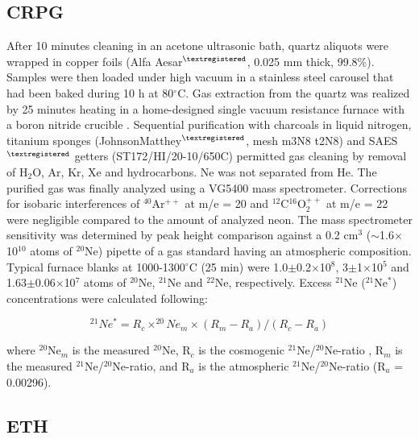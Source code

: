 \documentclass[authoryear,review,12pt]{elsarticle}
\begin{document}
\subsection{CRPG}

After 10 minutes cleaning in an acetone ultrasonic bath, quartz
aliquots were wrapped in copper foils (Alfa
Aesar$^{\tiny\textregistered}$, 0.025 mm thick, 99.8\%). Samples were
then loaded under high vacuum in a stainless steel carousel that had
been baked during 10 h at 80$^{\circ}$C. Gas extraction from the
quartz was realized by 25 minutes heating in a home-designed single
vacuum resistance furnace with a boron nitride crucible
\citep{zimmermann2012}. Sequential purification with charcoals in
liquid nitrogen, titanium sponges
(Johnson\-Matthey$^{\tiny\textregistered}$, mesh m3N8 t2N8) and
SAES$^{\tiny\textregistered}$ getters (ST172/HI/20-10/650C) permitted
gas cleaning by removal of H$_2$O, Ar, Kr, Xe and hydrocarbons. Ne was
not separated from He. The purified gas was finally analyzed using a
VG5400 mass spectrometer. Corrections for isobaric interferences of
$^{40}$Ar$^{++}$ at m/e = 20 and $^{12}$C$^{16}$O$_2^{++}$ at m/e = 22
were negligible compared to the amount of analyzed neon. The mass
spectrometer sensitivity was determined by peak height comparison
against a 0.2 cm$^3$ ($\sim$1.6$\times$10$^{10}$ atoms of $^{20}$Ne)
pipette of a gas standard having an atmospheric composition. Typical
furnace blanks at 1000-1300$^\circ$C (25 min) were
1.0$\pm$0.2$\times$10$^{8}$, 3$\pm$1$\times$10$^{5}$ and
1.63$\pm$0.06$\times$10$^{7}$ atoms of $^{20}$Ne, $^{21}$Ne and
$^{22}$Ne, respectively. Excess $^{21}$Ne ($^{21}$Ne$^*$)
concentrations were calculated following:

\begin{equation}
^{21}Ne^* = R_c \times ^{20}Ne_m \times (R_m-R_a) / (R_c-R_a) 
\label{eq:Blard}
\end{equation}

where $^{20}$Ne$_m$ is the measured $^{20}$Ne, R$_c$ is the cosmogenic
$^{21}$Ne/$^{20}$Ne-ratio \citep[R$_c$ = 0.8;][]{niedermann2002},
R$_m$ is the measured $^{21}$Ne/$^{20}$Ne-ratio, and R$_a$ is the
atmospheric $^{21}$Ne/$^{20}$Ne-ratio (R$_a$ = 0.00296).

\subsection{ETH}
\end{document}
